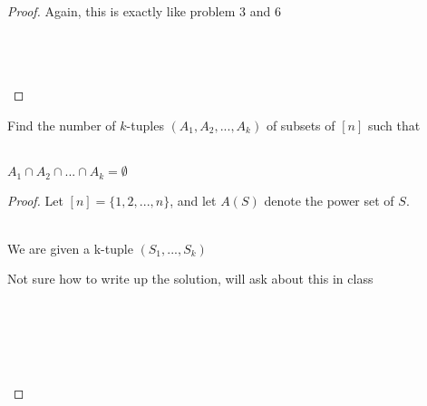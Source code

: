 \documentclass[12pt]{article}
\newenvironment{problem}[2][Problem]{\begin{trivlist}
\item[\hskip \labelsep {\bfseries #1}\hskip \labelsep {\bfseries #2.}]}{\end{trivlist}}
\begin{document}
 \begin{proof}
Again, this is exactly like problem 3 and 6 \\ \\
\centerline{} \\ \\
 \end{proof}
 
 \begin{problem}{14}
Find the number of $k$-tuples $(A_1,A_2,...,A_k)$ of subsets of $[n]$ such that \\ \\
\centerline{$A_1 \cap A_2 \cap ... \cap A_k = \emptyset$}
 \end{problem}
 
 \begin{proof}
 Let $[n] = \{1,2,...,n\}$, and let $A(S)$ denote the power set of $S$. \\ \\
 \centerline{We are given a k-tuple $(S_1,...,S_k)$}
 \centerline{Not sure how to write up the solution, will ask about this in class} \\ \\
 \centerline{} \\ \\
 \end{proof}
 

 
\end{document}
